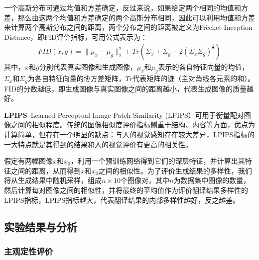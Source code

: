 一个高斯分布可通过均值和方差确定，反过来说，如果给定两个相同的均值和方差，那么由这两个均值和方差确定的两个高斯分布相同，因此可以利用均值和方差来计算两个高斯分布之间的距离，两个分布之间的距离被定义为Fr$\mathrm{\acute{e}}$chet Inception Distance，即FID评价指标，可用公式表示为：
\begin{equation}
\begin{split}
FID(x,g)=\parallel\mu_x-\mu_g\parallel_2^2+Tr(\varSigma_x+\varSigma_g-2(\varSigma_x\varSigma_g)^{\frac{1}{2}})
\end{split}
\label{eq:FID}
\end{equation}
其中，$x$和$g$分别代表真实图像和生成图像，$\mu_x$和$\mu_g$表示的各自特征向量的均值，$\varSigma_x$和$\varSigma_g$为各自特征向量的协方差矩阵，$Tr$代表矩阵的迹（主对角线各元素的和）。FID的分数越低，即生成图像与真实图像之间的距离越小，代表生成图像的质量越好。

$\mathbf{LPIPS}$~Learned Perceptual Image Patch Similarity (LPIPS\cite{zhang2018perceptual}）可用于衡量配对图像之间的相似程度。传统的图像相似度评价指标侧重于结构、内容等方面，优点为计算简单，但存在一个明显的缺点：与人的视觉感知存在较大差异，LPIPS指标的一大特点就是其得到的结果和人的视觉评价有更高的相关性。

假定有两幅图像$x$和$x_0$，利用一个预训练网络得到它们的深层特征，并计算出其特征之间的距离，从而得到$x$和$x_0$之间的相似性。为了评价生成结果的多样性，我们将从生成结果中随机采样，组成$n\times10$个图像对，其中$n$为数据集中图像的数量，然后计算每对图像之间的相似性，并将最终的平均值作为评价翻译结果多样性的LPIPS指标，LPIPS指标越大，代表翻译结果的内部多样性越好，反之越差。

\subsection{实验结果与分析}

\subsubsection{主观定性评价}

